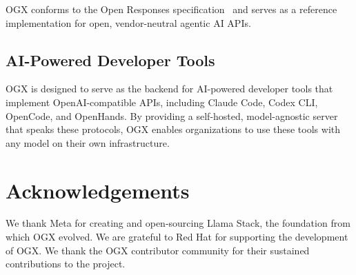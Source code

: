 \documentclass[11pt]{article}
\begin{document}
OGX conforms to the Open Responses specification~\cite{openresponses} and serves as a reference implementation for open, vendor-neutral agentic AI APIs.

\subsection{AI-Powered Developer Tools}

OGX is designed to serve as the backend for AI-powered developer tools that implement OpenAI-compatible APIs, including Claude Code, Codex CLI, OpenCode, and OpenHands. By providing a self-hosted, model-agnostic server that speaks these protocols, OGX enables organizations to use these tools with any model on their own infrastructure.

\section{Acknowledgements}

We thank Meta for creating and open-sourcing Llama Stack, the foundation from which OGX evolved. We are grateful to Red Hat for supporting the development of OGX. We thank the OGX contributor community for their sustained contributions to the project.



\end{document}
